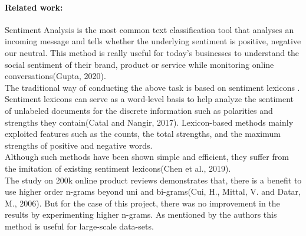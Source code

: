 \documentclass[12pt]{report}
\begin{document}
	
	  
	
	
	\paragraph{Related work:}
	Sentiment Analysis is the most common text classification tool that analyses an incoming message and tells whether the underlying sentiment is positive, negative our neutral. This method is really useful for today's businesses to understand the social sentiment of their brand, product or service while monitoring online conversations(Gupta, 2020).\\
	
	The traditional way of conducting the above task is based on sentiment lexicons . Sentiment lexicons can serve as a word-level basis to help analyze the sentiment of unlabeled documents for the discrete information such as polarities and strengths they contain(Catal and Nangir, 2017). Lexicon-based methods mainly exploited features such as the counts, the total strengths, and the maximum strengths of positive and negative words.\\
	Although such methods have been shown simple and efficient, they suffer from the imitation of existing sentiment lexicons(Chen et al., 2019).\\
	
	The study on 200k online product reviews demonstrates that, there is a benefit to use higher order n-grams beyond uni and bi-grams(Cui, H., Mittal, V. and Datar, M., 2006). But for the case of this project, there was no improvement in the results by experimenting higher n-grams.
	As mentioned by the authors this method is useful for large-scale data-sets. \\
	
	
	
\end{document}
